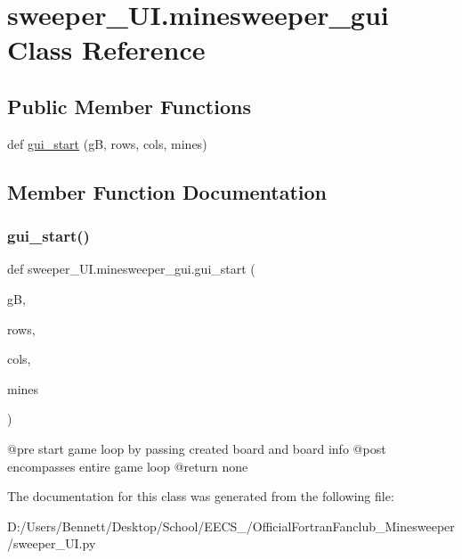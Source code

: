 \hypertarget{classsweeper___u_i_1_1minesweeper__gui}{}\section{sweeper\+\_\+\+U\+I.\+minesweeper\+\_\+gui Class Reference}
\label{classsweeper___u_i_1_1minesweeper__gui}
\subsection*{Public Member Functions}
\begin{DoxyCompactItemize}
\item 
def \mbox{\hyperlink{classsweeper___u_i_1_1minesweeper__gui_a9b40d50bb0783902917d33f0bbc14bf1}{gui\+\_\+start}} (gB, rows, cols, mines)
\end{DoxyCompactItemize}


\subsection{Member Function Documentation}
\mbox{\label{classsweeper___u_i_1_1minesweeper__gui_a9b40d50bb0783902917d33f0bbc14bf1}} 
\subsubsection{\texorpdfstring{gui\+\_\+start()}{gui\_start()}}
{\footnotesize\ttfamily def sweeper\+\_\+\+U\+I.\+minesweeper\+\_\+gui.\+gui\+\_\+start (\begin{DoxyParamCaption}\item[{}]{gB,  }\item[{}]{rows,  }\item[{}]{cols,  }\item[{}]{mines }\end{DoxyParamCaption})}

\begin{DoxyVerb}@pre start game loop by passing created board and board info
@post encompasses entire game loop
@return none
\end{DoxyVerb}
 

The documentation for this class was generated from the following file\+:\begin{DoxyCompactItemize}
\item 
D\+:/\+Users/\+Bennett/\+Desktop/\+School/\+E\+E\+C\+S\+\_/\+Official\+Fortran\+Fanclub\+\_\+\+Minesweeper/sweeper\+\_\+\+U\+I.\+py\end{DoxyCompactItemize}
